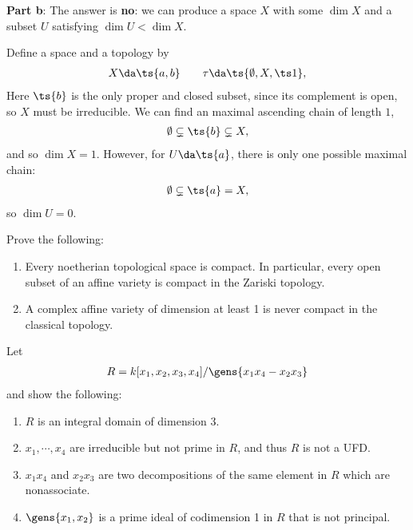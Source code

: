 \begin{solution}
\textbf{Part b}: The answer is \textbf{no}: we can produce a space \(X\)
with some \(\dim X\) and a subset \(U\) satisfying \(\dim U < \dim X\).

Define a space and a topology by
\begin{align*}  
X \da \ts{a, b} \qquad \tau \da\ts{\emptyset, X, \ts 1}
,\end{align*} Here \(\ts{b}\) is the only proper and closed subset,
since its complement is open, so \(X\) must be irreducible. We can find
an maximal ascending chain of length \(1\),
\begin{align*}  
\emptyset \subsetneq \ts{b} \subsetneq X
,\end{align*} and so \(\dim X = 1\). However, for \(U\da \ts{a}\), there
is only one possible maximal chain:
\begin{align*}  
\emptyset \subsetneq \ts{a} = X
,\end{align*} so \(\dim U = 0\).

\end{solution}

\begin{exercise}[Gathmann 2.36]

Prove the following:

\begin{enumerate}
\def\labelenumi{\alph{enumi}.}
\item
  Every noetherian topological space is compact. In particular, every
  open subset of an affine variety is compact in the Zariski topology.
\item
  A complex affine variety of dimension at least 1 is never compact in
  the classical topology.
\end{enumerate}

\end{exercise}

\begin{exercise}[Gathmann 2.40]

Let
\begin{align*}  
R = k[x_1, x_2, x_3, x_4] / \gens{x_1 x_4 - x_2 x_3} 
\end{align*} and show the following:

\begin{enumerate}
\def\labelenumi{\alph{enumi}.}
\item
  \(R\) is an integral domain of dimension 3.
\item
  \(x_1, \cdots, x_4\) are irreducible but not prime in \(R\), and thus
  \(R\) is not a UFD.
\item
  \(x_1 x_4\) and \(x_2 x_3\) are two decompositions of the same element
  in \(R\) which are nonassociate.
\item
  \(\gens{x_1, x_2}\) is a prime ideal of codimension 1 in \(R\) that is
  not principal.
\end{enumerate}

\end{exercise}

